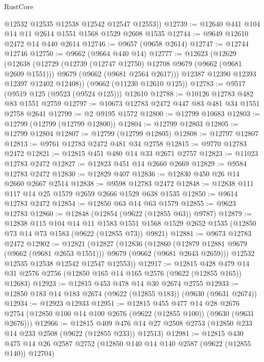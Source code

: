 \begin{lexlean}{RustCore}
\begin{coremodule}
        @12532
        @12535
        @12538
        @12542
        @12547
        @12553))
@12739 := @12640 @441 @104 @14 @11 @2614 @1551 @1568 @1529 @2608 @1535
@12744 := @9649 @12610 @2472 @14 @440 @2614
@12746 := @9657 (@9658 @2614)
@12747 := @12744 @12746
@12750 := @9662 (@9664 @440 @14)
@12777 := @12623
    (@12629
      (@12638
        (@12729
          (@12739 (@12747 @12750) @12708 @9679 (@9662 (@9681 @2609 @1551)))
          @9679
          (@9662 (@9681 @2564 @2617)))
        @12387
        @12390
        @12393
        @12397
        @12402
        @12408))
    (@9662 (@11230 @12610 @125))
@12783 := @9517 (@9519 @125 (@9523 (@9524 @125))) @12610
@12788 := @10126 @12783 @482 @83 @1551 @2759
@12797 := @10673 @12783 @2472 @447 @83 @481 @34 @1551 @2758 @2641
@12799 := @2 @9195 @1572
@12800 := @12799 @10683
@12803 := @12799 (@12799 (@12799 @12800))
@12804 := @12799 @12803
@12805 := @12799 @12804
@12807 := @12799 (@12799 @12805)
@12808 := @12797 @12807
@12813 := @9761 @12783 @2472 @481 @34 @2758
@12815 := @9770 @12783 @2472
@12821 := @12815 @451 @480 @14 @33 @2671 @2757
@12823 := @11023 @12783 @2472
@12827 := @12823 @451 @14 @2660 @2669
@12829 := @9584 @12783 @2472
@12830 := @12829 @407
@12836 := @12830 @450 @26 @14 @2660 @2667 @2514
@12838 := @9598 @12783 @2472
@12848 := @12838 @111 @117 @14 @25 @1579 @2659 @2666 @1529 @638 @1535
@12850 := @9614 @12783 @2472
@12854 := @12850 @63 @14 @63 @1579
@12855 := @9623 @12783
@12860 := @12848 (@12854 (@9622 (@12855 @63)) @9787)
@12879 := @12838
    @115
    @104
    @14
    @11
    @1583
    @1551
    @1568
    @1529
    @2652
    @1535
    (@12850 @73 @14 @73 @1583 (@9622 (@12855 @73)) @9821)
@12881 := @9673 @12783 @2472
@12902 := @12821
    (@12827
      (@12836
        (@12860 (@12879 @12881 @9679 (@9662 (@9681 @2653 @1551))) @9679 (@9662 (@9681 @2643 @2659)))
        @12532
        @12535
        @12538
        @12542
        @12547
        @12553))
@12917 := @12815
    @428
    @479
    @14
    @31
    @2576
    @2756
    (@12850 @165 @14 @165 @2576 (@9622 (@12855 @165)) @12683)
@12923 := @12815 @453 @478 @14 @30 @2674 @2755
@12933 := @12850 @183 @14 @183 @2674 (@9622 (@12855 @183)) (@9630 (@9631 @2674))
@12934 := @12923 @12933
@12951 := @12815
    @455
    @477
    @14
    @28
    @2676
    @2754
    (@12850 @100 @14 @100 @2676 (@9622 (@12855 @100)) (@9630 (@9631 @2676)))
@12966 := @12815
    @409
    @476
    @14
    @27
    @2508
    @2753
    (@12850 @233 @14 @233 @2508 (@9622 (@12855 @233)) @12513)
@12981 := @12815
    @430
    @475
    @14
    @26
    @2587
    @2752
    (@12850 @140 @14 @140 @2587 (@9622 (@12855 @140)) @12704)

\end{coremodule}
\end{lexlean}
